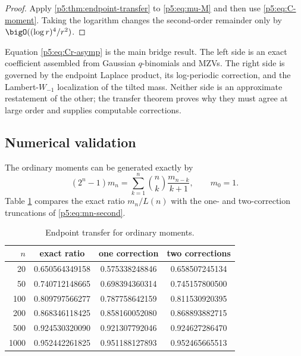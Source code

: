 \documentclass[11pt]{article}
\numberwithin{equation}{section}
\theoremstyle{definition}
\theoremstyle{remark}
\begin{document}
\begin{proof}
Apply \cref{p5:thm:endpoint-transfer} to \cref{p5:eq:mu-M} and then use
\cref{p5:eq:C-moment}.  Taking the logarithm changes the second-order remainder
only by $\bigO((\log r)^4/r^2)$.
\end{proof}

\begin{boxedremark}
Equation \cref{p5:eq:Cr-asymp} is the main bridge result.  The left side is an
exact coefficient assembled from Gaussian $q$-binomials and MZVs.  The right
side is governed by the endpoint Laplace product, its log-periodic correction,
and the Lambert-$W_{-1}$ localization of the tilted mass.  Neither side is an
approximate restatement of the other; the transfer theorem proves why they
must agree at large order and supplies computable corrections.
\end{boxedremark}

\subsection{Numerical validation}

The ordinary moments can be generated exactly by
\begin{equation}\label{p5:eq:mn-recurrence}
 (2^n-1)m_n=\sum_{k=1}^{n}\binom nk\frac{m_{n-k}}{k+1},
 \qquad m_0=1.
\end{equation}
Table \ref{p5:tab:ordinary-transfer} compares the exact ratio $m_n/L(n)$ with the
one- and two-correction truncations of \cref{p5:eq:mn-second}.

\begin{table}[ht]
\centering
\caption{Endpoint transfer for ordinary moments.}
\label{p5:tab:ordinary-transfer}
\begin{tabular}{@{}rccc@{}}
\toprule
$n$ & exact ratio & one correction & two corrections\\
\midrule
20   & 0.650564349158 & 0.575338248846 & 0.658507245134\\
50   & 0.740712148665 & 0.698394360314 & 0.745157800500\\
100  & 0.809797566277 & 0.787758642159 & 0.811530920395\\
200  & 0.868346118425 & 0.858160052080 & 0.868893882715\\
500  & 0.924530320090 & 0.921307792046 & 0.924627286470\\
1000 & 0.952442261825 & 0.951188127893 & 0.952465665513\\
\bottomrule
\end{tabular}
\end{table}
\end{document}
